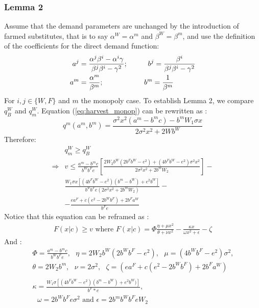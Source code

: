 \subsubsection{Lemma 2}
\label{section:AppendixC}
Assume that the demand parameters are unchanged by the introduction of farmed substitutes, that is to say $\alpha^W  = \alpha ^m$ and $\beta^W= \beta^m$, and use the definition of the coefficients for the direct demand function:
\begin{align*}
 a^{j} &= \frac{\alpha^{j} \beta^{i} - \alpha^{i}\gamma}{\beta^{j} \beta^{i} - \gamma^2}; \hspace*{1cm}
  b^{j} = \frac{\beta^{i}}{\beta^{j} \beta^{i} - \gamma^2}\\
 a^m &= \frac{\alpha^m}{\beta^m}; \hspace*{2cm}
b^m = \frac{1}{\beta^m}
\end{align*}
For $i,j \in \{W, F\}$ and $m$ the monopoly case.
To establish Lemma 2, we compare $q^W_B$ and $q^W_m$. Equation (\ref{eq:harvest_monop}) can be rewritten as : 
$$
q^m(a^m, b^m) = \frac{\sigma^2 x^2(a^m - b^m c) - b^m W_1 \sigma x}{2\sigma^2 x^2 +2Wb^W}
$$
%
Therefore:
\begin{align*}
    &q^W_m \geq q_B^W\\
    \Rightarrow & v \leq \frac{a^m - b^m c}{b^Wb^Fe}\left[ \frac{2 W_2 b^W(2b^Fb^W - e^2) + (4b^Fb^W - e^2)\sigma^2 x^2}{2 \sigma^2 x^2 + 2 b^m W_2}\right]  - \\
    & \frac{W_1 \sigma x[(4 b^F b^W - e^2)(b^m - b^W) + e^2 b^W]}{b^wb^Fe(2\sigma^2 x^2 + 2b^m W_2)} - \\
    & - \frac{ea^F + c(e^2 - 2b^Wb^F) + 2b^F a^W}{b^F e}
\end{align*}
Notice that this equation can be reframed as : 
\begin{align*}
    F(x|c) \geq v \text{ where } F(x|c) = \Phi \frac{\eta + \mu x^2}{\theta + \nu x^2} -\frac{ \kappa x}{\omega x^2 + \epsilon} - \zeta
\end{align*}
And :
\begin{align*}
    &\Phi = \frac{a^m - b^mc}{b^W b^F e},\text{ }
    \eta = 2W_2b^W(2b^Wb^F - e^2),\text{ } 
    \mu = (4b^Wb^F - e^2)\sigma^2,\text{ }\\
    &\theta= 2W_2b^m,\text{ }
    \nu = 2\sigma^2,\text{ }
    \zeta  = (ea^F + c(e^2 - 2b^W b^F) + 2b^F a^W)\\
    \\
    &\kappa = \frac{W_1 \sigma [(4b^F b^W - e^2)(b^m - b^W) + e^2 b^W)]}{b^F*e}, \\
    &\text{ }\omega = 2b^Wb^Fe \sigma^2
    \text{ and } \epsilon = 2b^m b^W b^F e W_2
\end{align*}
